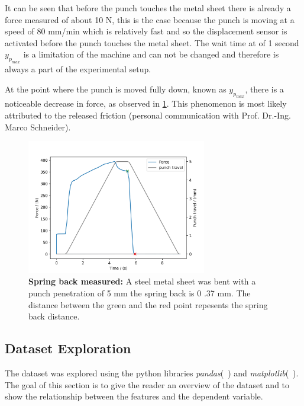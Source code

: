 It can be seen that before the punch touches the metal sheet there is already a force measured of about 10 N, this is
the case because the punch is moving at a speed of 80 mm/min which is relatively fast and so the displacement sensor
is activated before the punch touches the metal sheet.
The wait time at of 1 second $y_p_{max}$ is a limitation of the machine and can not be
changed and therefore is always a part of the experimental setup.

At the point where the punch is moved fully down, known as $y_p_{max}$, there is a noticeable decrease in force, as
observed in \cref{fig:springback_measured}.
This phenomenon is most likely attributed to the released friction (personal communication with Prof. Dr.-Ing. Marco
Schneider).

\begin{figure}[h]
    \begin{tcolorbox}[arc=0pt,boxrule=0.5pt]
        \centering
        \includegraphics[width=0.7\textwidth]{chap4/images/t1,5_V30_y_5_1.TRA.csv_springback}
    \end{tcolorbox}
    \caption{\textbf{Spring back measured:} A steel metal sheet was bent with a punch penetration of 5
    mm the spring back is 0 .37 mm.
    The distance between the green and the red point repesents the spring back distance.}
    \label{fig:springback_measured}
\end{figure}


\subsection{Dataset Exploration}\label{subsec:dataset-exploration}
The dataset was explored using the python libraries \textit{pandas}(~\cite{mckinney-proc-scipy-2010})
and \textit{matplotlib}(~\cite{Hunter:2007}).
The goal of this section is to give the reader an overview of the dataset and
to show the relationship between the features and the dependent variable.

